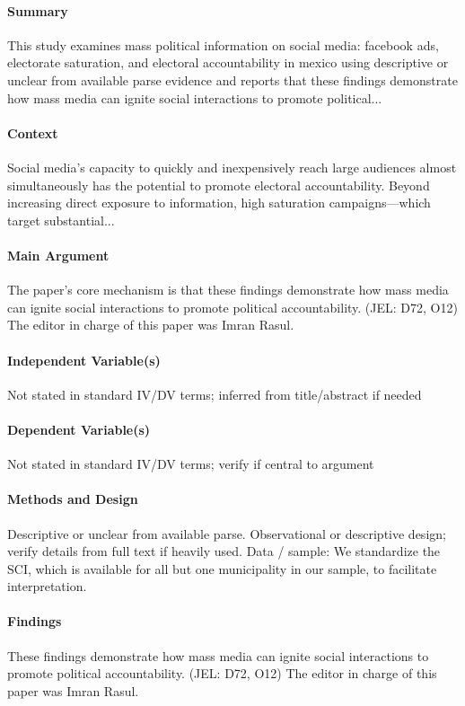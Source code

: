 \documentclass[12pt]{article}
\begin{document}
\paragraph{Summary} This study examines mass political information on social media: facebook ads, electorate saturation, and electoral accountability in mexico using descriptive or unclear from available parse evidence and reports that these findings demonstrate how mass media can ignite social interactions to promote political...

\paragraph{Context} Social media's capacity to quickly and inexpensively reach large audiences almost simultaneously has the potential to promote electoral accountability. Beyond increasing direct exposure to information, high saturation campaigns---which target substantial...

\paragraph{Main Argument} The paper's core mechanism is that these findings demonstrate how mass media can ignite social interactions to promote political accountability. (JEL: D72, O12) The editor in charge of this paper was Imran Rasul.

\paragraph{Independent Variable(s)} Not stated in standard IV/DV terms; inferred from title/abstract if needed

\paragraph{Dependent Variable(s)} Not stated in standard IV/DV terms; verify if central to argument

\paragraph{Methods and Design} Descriptive or unclear from available parse. Observational or descriptive design; verify details from full text if heavily used. Data / sample: We standardize the SCI, which is available for all but one municipality in our sample, to facilitate interpretation.

\paragraph{Findings} These findings demonstrate how mass media can ignite social interactions to promote political accountability. (JEL: D72, O12) The editor in charge of this paper was Imran Rasul.
\end{document}

